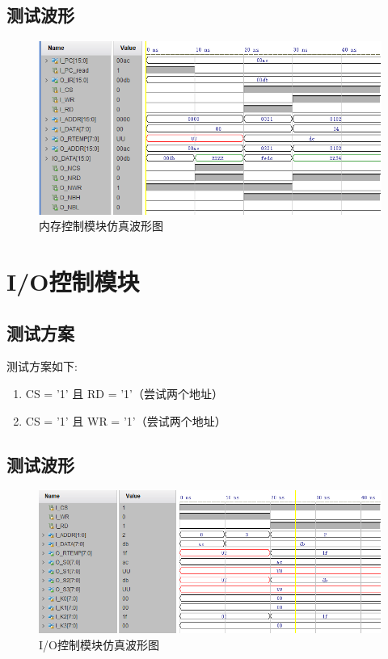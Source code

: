 \documentclass[forprint]{WHUBachelor}
\begin{document}
\subsection{测试波形}

\begin{figure}[H]
  \centering
  \includegraphics[width=5in]{figures/waveforms/ram_ctrl.png}
  \caption{内存控制模块仿真波形图}
  \label{fig:wave:ram_ctrl}
\end{figure}

\section{I/O控制模块}

\subsection{测试方案}

测试方案如下:
\begin{enumerate}[1.]
\item CS = '1' 且 RD = '1'（尝试两个地址）
\item CS = '1' 且 WR = '1'（尝试两个地址）
\end{enumerate}

\subsection{测试波形}

\begin{figure}[H]
  \centering
  \includegraphics[width=5in]{figures/waveforms/io_ctrl.png}
  \caption{I/O控制模块仿真波形图}
  \label{fig:wave:io_ctrl}
\end{figure}
\end{document}
